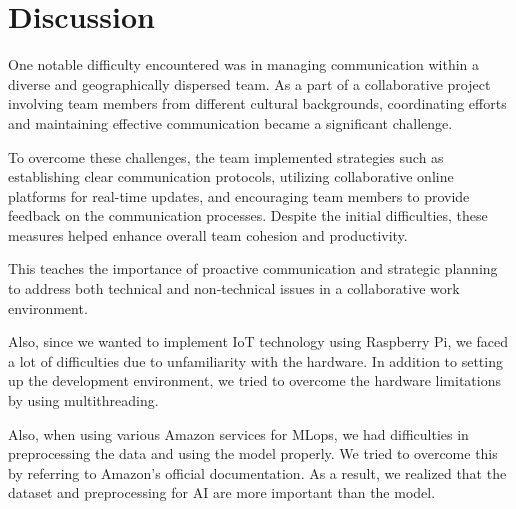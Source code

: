 \section{\textbf{Discussion}}

One notable difficulty encountered was in managing communication within a diverse and geographically dispersed team. As a part of a collaborative project involving team members from different cultural backgrounds, coordinating efforts and maintaining effective communication became a significant challenge. 

To overcome these challenges, the team implemented strategies such as establishing clear communication protocols, utilizing collaborative online platforms for real-time updates, and encouraging team members to provide feedback on the communication processes. Despite the initial difficulties, these measures helped enhance overall team cohesion and productivity.

This teaches the importance of proactive communication and strategic planning to address both technical and non-technical issues in a collaborative work environment.

Also, since we wanted to implement IoT technology using Raspberry Pi, we faced a lot of difficulties due to unfamiliarity with the hardware. In addition to setting up the development environment, we tried to overcome the hardware limitations by using multithreading.

Also, when using various Amazon services for MLops, we had difficulties in preprocessing the data and using the model properly. We tried to overcome this by referring to Amazon's official documentation. As a result, we realized that the dataset and preprocessing for AI are more important than the model.